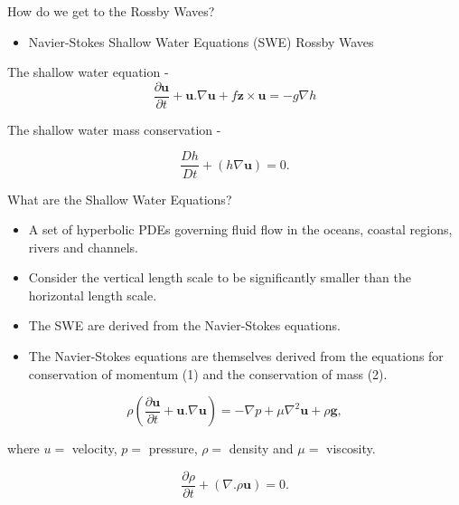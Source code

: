 \documentclass[12pt]{beamer}
\begin{document}
\begin{frame}{How do we get to the Rossby Waves?}

\begin{itemize}
\item Navier-Stokes \MVRightarrow  Shallow Water Equations (SWE) \MVRightarrow  Rossby Waves
\end{itemize}

\vspace{15pt}


The shallow water equation -
\begin{equation}
\frac{\partial{\textbf{u}}}{\partial{t}} + \textbf{u}.\nabla\textbf{u} + f \textbf{z} \times \textbf{u} = -g \nabla h
\end{equation}

The shallow water mass conservation - 

\begin{equation}
\frac{Dh}{Dt} + (h\nabla \textbf{u}) = 0.
\end{equation}
\end{frame}
\begin{frame}{What are the Shallow Water Equations?}

\begin{itemize}
\item A set of hyperbolic PDEs governing fluid flow in the oceans, coastal regions, rivers and channels.
\item Consider the vertical length scale to be significantly smaller than the horizontal length scale.
\item The SWE are derived from the Navier-Stokes equations.
\item The Navier-Stokes equations are themselves derived from the equations for conservation of momentum (1) and the conservation of mass (2).
\end{itemize}

\vspace{-15pt}

\begin{equation}   
\rho(\frac{\partial{\textbf{u}}}{\partial{t}} + \textbf{u}.\nabla \textbf{u}) = -\nabla p  + \mu \nabla^2\textbf{u} + \rho \textbf{g},
\end{equation}

where $u=$ velocity, $p=$ pressure, $\rho=$ density and $\mu=$ viscosity.

\begin{equation}
\frac{\partial{\rho}}{\partial{t}} + (\nabla.\rho \textbf{u}) = 0.
\end{equation}

\end{frame}
\end{document}
